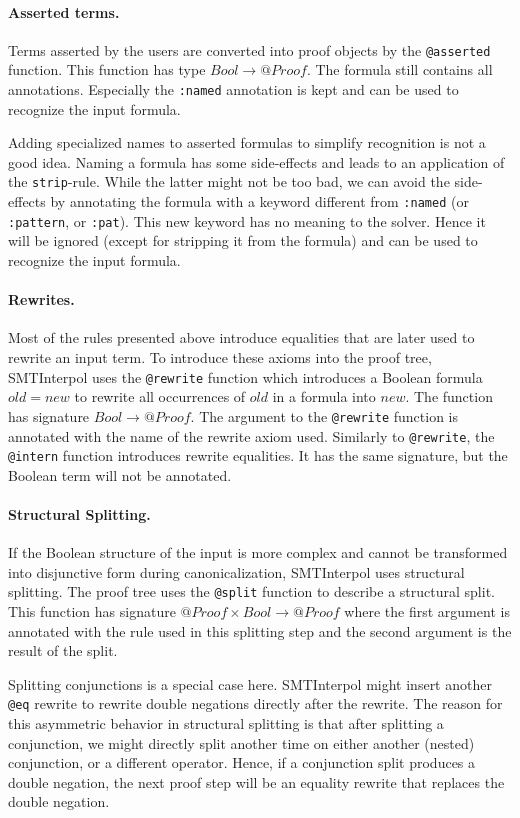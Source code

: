 \documentclass[a4paper]{article}
\newcommand\si{SMTInterpol\xspace}
\begin{document}
\paragraph{Asserted terms.}  Terms asserted by the users are converted into
proof objects by the \verb+@asserted+ function.  This function has type
$Bool\rightarrow @Proof$.  The formula still contains all annotations.
Especially the \verb+:named+ annotation is kept and can be used to recognize
the input formula.

Adding specialized names to asserted formulas to simplify recognition is not a
good idea.  Naming a formula has some side-effects and leads to an application
of the \verb+strip+-rule.  While the latter might not be too bad, we can avoid
the side-effects by annotating the formula with a keyword different from
\verb+:named+ (or \verb+:pattern+, or \verb+:pat+).  This new keyword has no
meaning to the solver.  Hence it will be ignored (except for stripping it from
the formula) and can be used to recognize the input formula.

\paragraph{Rewrites.}  Most of the rules presented above introduce equalities
that are later used to rewrite an input term.  To introduce these axioms into
the proof tree, \si uses the \verb+@rewrite+ function which introduces a
Boolean formula $old = new$ to rewrite all occurrences of $old$ in a formula
into $new$.  The function has signature $Bool\rightarrow @Proof$.  The
argument to the \verb+@rewrite+ function is annotated with the name of the
rewrite axiom used.  Similarly to \verb+@rewrite+, the \verb+@intern+ function
introduces rewrite equalities.  It has the same signature, but the Boolean
term will not be annotated.

\paragraph{Structural Splitting.}  If the Boolean structure of the input is
more complex and cannot be transformed into disjunctive form during
canonicalization, \si uses structural splitting.  The proof tree uses the
\verb+@split+ function to describe a structural split.  This function has
signature $@Proof\times Bool\rightarrow @Proof$ where the first argument is
annotated with the rule used in this splitting step and the second argument is
the result of the split.

Splitting conjunctions is a special case here.  \si might insert another
\verb+@eq+ rewrite to rewrite double negations directly after the rewrite.
The reason for this asymmetric behavior in structural splitting is that after
splitting a conjunction, we might directly split another time on either
another (nested) conjunction, or a different operator.  Hence, if a
conjunction split produces a double negation, the next proof step will be an
equality rewrite that replaces the double negation.
\end{document}
